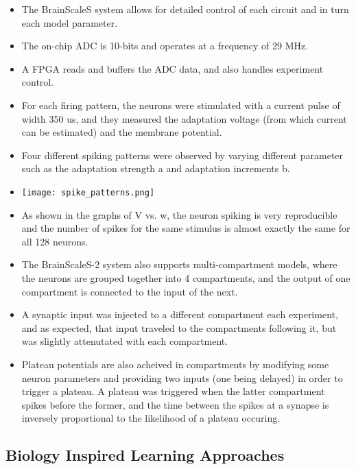 \documentclass[12pt, letterpaper]{article}
\begin{document}
\begin{itemize}
    \item The BrainScaleS system allows for detailed control of each circuit and in turn each model parameter.
    \item The on-chip ADC is 10-bits and operates at a frequency of 29 MHz.
    \item A FPGA reads and buffers the ADC data, and also handles experiment control.
    \item For each firing pattern, the neurons were stimulated with a current pulse of width 350 us, and they measured the adaptation voltage (from which current can be estimated) and the membrane potential.
    \item Four different spiking patterns were observed by varying different parameter such as the adaptation strength a and adaptation increments b.
    \item \texttt{[image: spike\_patterns.png]}
    \item As shown in the graphs of V vs. w, the neuron spiking is very reproducible and the number of spikes for the same stimulus is almost exactly the same for all 128 neurons.
    \item The BrainScaleS-2 system also supports multi-compartment models, where the neurons are grouped together into 4 compartments, and the output of one compartment is connected to the input of the next.
    \item A synaptic input was injected to a different compartment each experiment, and as expected, that input traveled to the compartments following it, but was slightly attenutated with each compartment.
    \item Plateau potentials are also acheived in compartments by modifying some neuron parameters and providing two inputs (one being delayed) in order to trigger a plateau. A plateau was triggered when the latter compartment spikes before the former, and the time between the spikes at a synapse is inversely proportional to the likelihood of a plateau occuring.
\end{itemize}

\subsection*{Biology Inspired Learning Approaches}
\end{document}
